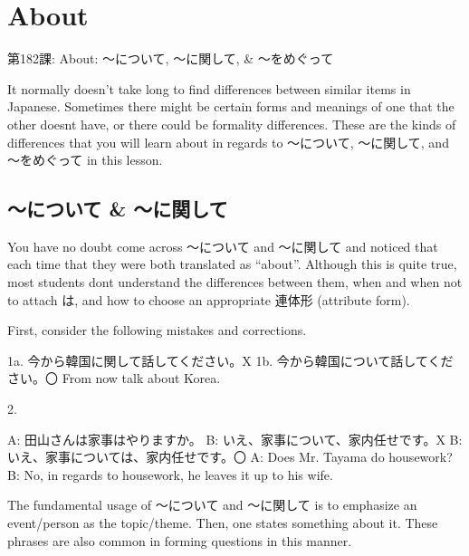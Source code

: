     
\chapter{About}

\begin{center}
\begin{Large}
第182課: About: ～について, ～に関して, \& ～をめぐって 
\end{Large}
\end{center}
 
\par{ It normally doesn't take long to find differences between similar items in Japanese. Sometimes there might be certain forms and meanings of one that the other doesn\textquotesingle t have, or there could be formality differences. These are the kinds of differences that you will learn about in regards to ～について, ～に関して, and ～をめぐって in this lesson. }
      
\section{～について \& ～に関して}
 
\par{ You have no doubt come across ～について and ～に関して and noticed that each time that they were both translated as “about”. Although this is quite true, most students don\textquotesingle t understand the differences between them, when and when not to attach は, and how to choose an appropriate 連体形 (attribute form). }

\par{ First, consider the following mistakes and corrections. }

\par{1a. 今から韓国に関して話してください。X \hfill\break
1b. 今から韓国について話してください。〇 \hfill\break
From now talk about Korea. }

\par{2. }

\par{A: 田山さんは家事はやりますか。 \hfill\break
B: いえ、家事について、家内任せです。X \hfill\break
B: いえ、家事については、家内任せです。〇 \hfill\break
A: Does Mr. Tayama do housework? \hfill\break
B: No, in regards to housework, he leaves it up to his wife. }

\par{ The fundamental usage of ～について and ～に関して is to emphasize an event\slash person as the topic\slash theme. Then, one states something about it. These phrases are also common in forming questions in this manner. }

